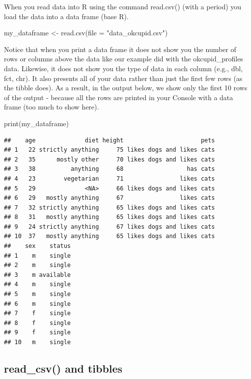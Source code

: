 \documentclass[
]{krantz}
\makeatletter
\newenvironment{Shaded}{\begin{snugshade}}{\end{snugshade}}
\newcommand{\AttributeTok}[1]{\textcolor[rgb]{0.61,0.61,0.61}{#1}}
\newcommand{\FunctionTok}[1]{\textcolor[rgb]{0,0,0}{#1}}
\newcommand{\NormalTok}[1]{#1}
\newcommand{\OtherTok}[1]{\textcolor[rgb]{0.37,0.37,0.37}{#1}}
\newcommand{\StringTok}[1]{\textcolor[rgb]{0.5,0.5,0.5}{#1}}
\newenvironment{kframe}{%
\medskip{}
\setlength{\fboxsep}{.8em}
 \def\at@end@of@kframe{}%
 \ifinner\ifhmode%
  \def\at@end@of@kframe{\end{minipage}}%
  \begin{minipage}{\columnwidth}%
 \fi\fi%
 \def\FrameCommand##1{\hskip\@totalleftmargin \hskip-\fboxsep
 \colorbox{shadecolor}{##1}\hskip-\fboxsep
     \hskip-\linewidth \hskip-\@totalleftmargin \hskip\columnwidth}%
 \MakeFramed {\advance\hsize-\width
   \@totalleftmargin\z@ \linewidth\hsize
   \@setminipage}}%
 {\par\unskip\endMakeFramed%
 \at@end@of@kframe}
\renewenvironment{Shaded}{\begin{kframe}}{\end{kframe}}
\makeatother
\begin{document}
When you read data into R using the command read.csv() (with a period) you load the data into a data frame (base R).

\begin{Shaded}
\begin{Highlighting}[]
\NormalTok{my\_dataframe }\OtherTok{\textless{}{-}} \FunctionTok{read.csv}\NormalTok{(}\AttributeTok{file =} \StringTok{"data\_okcupid.csv"}\NormalTok{)}
\end{Highlighting}
\end{Shaded}

Notice that when you print a data frame it does not show you the number of rows or columns above the data like our example did with the okcupid\_profiles data. Likewise, it does not show you the type of data in each column (e.g., dbl, fct, chr). It also presents all of your data rather than just the first few rows (as the tibble does). As a result, in the output below, we show only the first 10 rows of the output - because all the rows are printed in your Console with a data frame (too much to show here).

\begin{Shaded}
\begin{Highlighting}[]
\FunctionTok{print}\NormalTok{(my\_dataframe)}
\end{Highlighting}
\end{Shaded}

\begin{verbatim}
##    age              diet height                      pets
## 1   22 strictly anything     75 likes dogs and likes cats
## 2   35      mostly other     70 likes dogs and likes cats
## 3   38          anything     68                  has cats
## 4   23        vegetarian     71                likes cats
## 5   29              <NA>     66 likes dogs and likes cats
## 6   29   mostly anything     67                likes cats
## 7   32 strictly anything     65 likes dogs and likes cats
## 8   31   mostly anything     65 likes dogs and likes cats
## 9   24 strictly anything     67 likes dogs and likes cats
## 10  37   mostly anything     65 likes dogs and likes cats
##    sex    status
## 1    m    single
## 2    m    single
## 3    m available
## 4    m    single
## 5    m    single
## 6    m    single
## 7    f    single
## 8    f    single
## 9    f    single
## 10   m    single
\end{verbatim}

\hypertarget{read_csv-and-tibbles}{%
\subsection{read\_csv() and tibbles}\label{read_csv-and-tibbles}}
\end{document}
